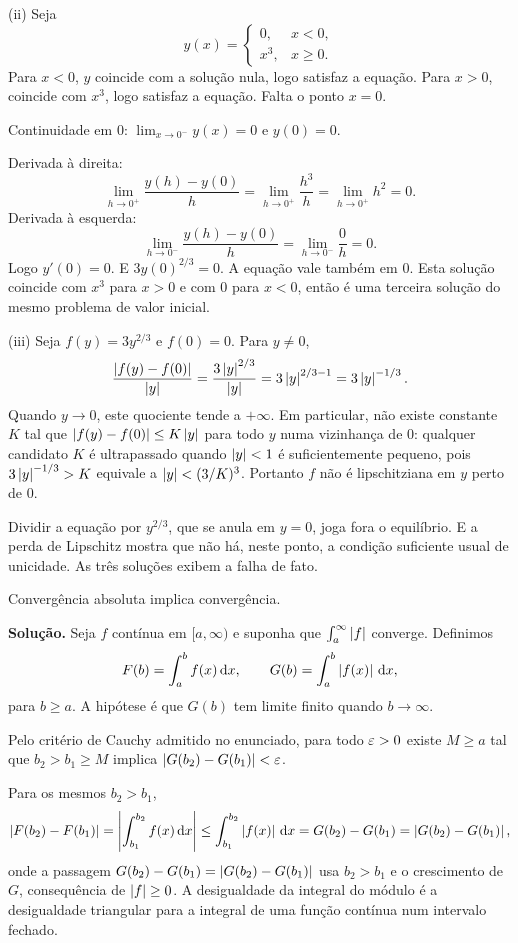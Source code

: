 \documentclass[11pt,a4paper]{article}
\begin{document}
(ii) Seja
\[
y(x)=
\begin{cases}
0,&x<0,\\
x^{3},&x\ge 0.
\end{cases}
\]
Para \(x<0\), \(y\) coincide com a solução nula, logo satisfaz a equação. Para \(x>0\), coincide com \(x^{3}\), logo satisfaz a equação. Falta o ponto \(x=0\).

Continuidade em \(0\): \(\lim_{x\to 0^{-}} y(x)=0\) e \(y(0)=0\).

Derivada à direita:
\[
\lim_{h\to 0^{+}}\frac{y(h)-y(0)}{h}
=\lim_{h\to 0^{+}}\frac{h^{3}}{h}
=\lim_{h\to 0^{+}}h^{2}=0.
\]
Derivada à esquerda:
\[
\lim_{h\to 0^{-}}\frac{y(h)-y(0)}{h}
=\lim_{h\to 0^{-}}\frac{0}{h}=0.
\]
Logo \(y'(0)=0\). E \(3y(0)^{2/3}=0\). A equação vale também em \(0\). Esta solução coincide com \(x^{3}\) para \(x>0\) e com \(0\) para \(x<0\), então é uma terceira solução do mesmo problema de valor inicial.

(iii) Seja \(f(y)=3y^{2/3}\) e \(f(0)=0\). Para \(y\neq 0\),
\[
\frac{\left\lvert f(y)-f(0) \right\rvert}{\left\lvert y \right\rvert}
=\frac{3\left\lvert y \right\rvert^{2/3}}{\left\lvert y \right\rvert}
=3\left\lvert y \right\rvert^{2/3-1}
=3\left\lvert y \right\rvert^{-1/3}.
\]
Quando \(y\to 0\), este quociente tende a \(+\infty\). Em particular, não existe constante \(K\) tal que \(\left\lvert f(y)-f(0) \right\rvert\le K\left\lvert y \right\rvert\) para todo \(y\) numa vizinhança de \(0\): qualquer candidato \(K\) é ultrapassado quando \(\left\lvert y \right\rvert<1\) é suficientemente pequeno, pois \(3\left\lvert y \right\rvert^{-1/3}>K\) equivale a \(\left\lvert y \right\rvert<(3/K)^{3}\). Portanto \(f\) não é lipschitziana em \(y\) perto de \(0\).

Dividir a equação por \(y^{2/3}\), que se anula em \(y=0\), joga fora o equilíbrio. E a perda de Lipschitz mostra que não há, neste ponto, a condição suficiente usual de unicidade. As três soluções exibem a falha de fato.

\begin{exercicio}[Avançado --- A3]
Convergência absoluta implica convergência.
\end{exercicio}

\noindent\textbf{Solução.}
Seja \(f\) contínua em \([a,\infty)\) e suponha que \(\int_a^{\infty}\left\lvert f \right\rvert\) converge. Definimos
\[
F(b)=\int_a^{b} f(x)\,\mathrm{d} x,\qquad
G(b)=\int_a^{b}\left\lvert f(x) \right\rvert\,\mathrm{d} x,
\]
para \(b\ge a\). A hipótese é que \(G(b)\) tem limite finito quando \(b\to\infty\).

Pelo critério de Cauchy admitido no enunciado, para todo \(\varepsilon>0\) existe \(M\ge a\) tal que \(b_{2}>b_{1}\ge M\) implica \(\left\lvert G(b_{2})-G(b_{1}) \right\rvert<\varepsilon\).

Para os mesmos \(b_{2}>b_{1}\),
\[
\left\lvert F(b_{2})-F(b_{1}) \right\rvert
=\Biggl\lvert\int_{b_{1}}^{b_{2}} f(x)\,\mathrm{d} x\Biggr\rvert
\le\int_{b_{1}}^{b_{2}}\left\lvert f(x) \right\rvert\,\mathrm{d} x
=G(b_{2})-G(b_{1})
=\left\lvert G(b_{2})-G(b_{1}) \right\rvert,
\]
onde a passagem \(G(b_{2})-G(b_{1})=\left\lvert G(b_{2})-G(b_{1}) \right\rvert\) usa \(b_{2}>b_{1}\) e o crescimento de \(G\), consequência de \(\left\lvert f \right\rvert\ge 0\). A desigualdade da integral do módulo é a desigualdade triangular para a integral de uma função contínua num intervalo fechado.
\end{document}
